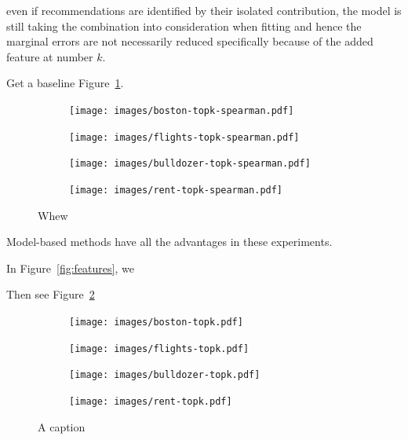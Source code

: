 \documentclass[12pt]{article}
\newcommand{\figref}[1]{Figure~\ref{#1}}
\begin{document}
even if recommendations are identified by their isolated contribution, the model is still taking the combination into consideration when fitting and hence the marginal errors are not necessarily reduced specifically because of the added feature at number $k$.

Get a baseline \figref{fig:baseline}.

\begin{figure}
\centering
\begin{subfigure}{.24\textwidth}
    \centering
\texttt{[image: images/boston-topk-spearman.pdf]}
\end{subfigure}%
\hfill
\begin{subfigure}{.24\textwidth}
    \centering
\texttt{[image: images/flights-topk-spearman.pdf]}
\end{subfigure}
\hfill
\begin{subfigure}{.24\textwidth}
    \centering
\texttt{[image: images/bulldozer-topk-spearman.pdf]}
\end{subfigure}
\hfill
\begin{subfigure}{.24\textwidth}
    \centering
\texttt{[image: images/rent-topk-spearman.pdf]}
\end{subfigure}
\caption{Whew}
\label{fig:baseline}
\end{figure}

Model-based methods have all the advantages in these experiments.

In \figref{fig:features}, we

Then see \figref{fig:topk}

\begin{figure}
\centering
\begin{subfigure}{.24\textwidth}
    \centering
\texttt{[image: images/boston-topk.pdf]}
\end{subfigure}%
\hfill
\begin{subfigure}{.23\textwidth}
    \centering
\texttt{[image: images/flights-topk.pdf]}
\end{subfigure}
\hfill
\begin{subfigure}{.25\textwidth}
    \centering
\texttt{[image: images/bulldozer-topk.pdf]}
\end{subfigure}%
\hfill
\begin{subfigure}{.2\textwidth}
    \centering
\texttt{[image: images/rent-topk.pdf]}
\end{subfigure}
\caption[short]{A caption}
\label{fig:topk}
\end{figure}
\end{document}
